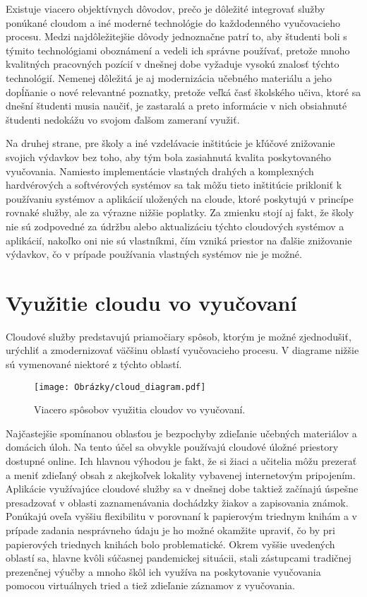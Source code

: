 \documentclass[10pt,slovak,a4paper]{article}%
\begin{document}
Existuje viacero objektívnych dôvodov, prečo je dôležité integrovať služby ponúkané cloudom a iné moderné technológie do každodenného vyučovacieho procesu. Medzi najdôležitejšie dôvody jednoznačne patrí to, aby študenti boli s týmito technológiami oboznámení a vedeli ich správne používať, pretože mnoho kvalitných pracovných pozícií v dnešnej dobe vyžaduje vysokú znalosť týchto technológií\cite{Babu_enrichingeducation}. Nemenej dôležitá je aj modernizácia učebného materiálu a jeho dopĺňanie o nové relevantné poznatky, pretože veľká časť školského učiva, ktoré sa dnešní študenti musia naučiť, je zastaralá a preto informácie v nich obsiahnuté študenti nedokážu vo svojom ďalšom zameraní využiť.

Na druhej strane, pre školy a iné vzdelávacie inštitúcie je kľúčové znižovanie svojich výdavkov bez toho, aby tým bola zasiahnutá kvalita poskytovaného vyučovania. Namiesto implementácie vlastných drahých a komplexných hardvérových a softvérových systémov sa tak môžu tieto inštitúcie prikloniť k používaniu systémov a aplikácií uložených na cloude, ktoré poskytujú v princípe rovnaké služby, ale za výrazne nižšie poplatky\cite{Mhouti_benefits_challenges}. Za zmienku stojí aj fakt, že školy nie sú zodpovedné za údržbu alebo aktualizáciu týchto cloudových systémov a aplikácií, nakoľko oni nie sú vlastníkmi, čím vzniká priestor na ďalšie znižovanie výdavkov\cite{Narkar_cloud-basededucation}, čo v prípade používania vlastných systémov nie je možné. 


\section{Využitie cloudu vo vyučovaní}

Cloudové služby predstavujú priamočiary spôsob, ktorým je možné zjednodušiť, urýchliť a zmodernizovať väčšinu oblastí vyučovacieho procesu. V diagrame nižšie sú vymenované niektoré z týchto oblastí.

\begin{figure}[h]
\texttt{[image: Obrázky/cloud\_diagram.pdf]}
\caption{Viacero spôsobov využitia cloudov vo vyučovaní.}
\end{figure}

Najčastejšie spomínanou oblasťou je bezpochyby zdieľanie učebných materiálov a domácich úloh. Na tento účel sa obvykle používajú cloudové úložné priestory dostupné online. Ich hlavnou výhodou je fakt, že si žiaci a učitelia môžu prezerať a meniť zdieľaný obsah z akejkoľvek lokality vybavenej internetovým pripojením. Aplikácie využívajúce cloudové služby sa v dnešnej dobe taktiež začínajú úspešne presadzovať v oblasti zaznamenávania dochádzky žiakov a zapisovania známok. Ponúkajú oveľa vyššiu flexibilitu v porovnaní k papierovým triednym knihám a v prípade zadania nesprávneho údaju je ho možné okamžite upraviť, čo by pri papierových triednych knihách bolo problematické. Okrem vyššie uvedených oblastí sa, hlavne kvôli súčasnej pandemickej situácii, stali zástupcami tradičnej prezenčnej výučby a mnoho škôl ich využíva na poskytovanie vyučovania pomocou virtuálnych tried a tiež zdieľanie záznamov z vyučovania.
\end{document}
